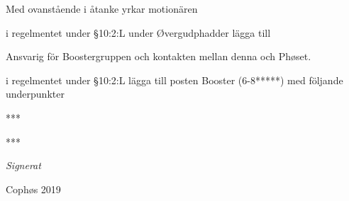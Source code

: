 \documentclass[../_main/handlingar.tex]{subfiles}
\begin{document}
Med ovanstående i åtanke yrkar motionären

\begin{attsatser}

    \att i regelmentet under \S10:2:L under  Øvergudphadder lägga till \par

    \begin{dashlist}
        \item Ansvarig för Boostergruppen och kontakten mellan denna och Phøset.
    \end{dashlist}

    \att i regelmentet under \S10:2:L lägga till posten Booster (6-8*****) med följande underpunkter   
    \begin{dashlist}
        \item ****
        \item **** 
    \end{dashlist}

\end{attsatser}


\begin{signatures}{1}
    \textit{Signerat}
    \signature{Tove Börjeson}{Cophøs 2019}
\end{signatures}
\end{document}
